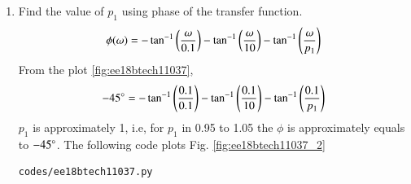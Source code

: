 \begin{enumerate}[label=\thesubsection.\arabic*.,ref=\thesubsection.\theenumi]
\item Find the value of $p_1$ using phase of the transfer function.
\\
\solution
\begin{align}
\phi(\omega) = -\tan^{-1} \left(\frac{\omega}{0.1}\right)-\tan^{-1} \left(\frac{\omega}{10}\right)-\tan^{-1} \left(\frac{\omega}{p_1}\right)
\end{align}
From the plot \ref{fig:ee18btech11037},
\begin{align}
-45\degree = -\tan^{-1}\left(\frac{0.1}{0.1}\right) -\tan^{-1}\left(\frac{0.1}{10}\right) -\tan^{-1}\left(\frac{0.1}{p_1}\right)
\end{align}
 $p_1$ is approximately 1, i.e, for $p_1$ in 0.95 to 1.05 the $\phi$ is approximately equals to $-45\degree$.
%
The following code plots Fig. \ref{fig:ee18btech11037_2}

\begin{lstlisting}
codes/ee18btech11037.py
\end{lstlisting}

\end{enumerate}